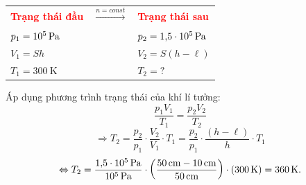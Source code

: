 \begin{vd}
{\begin{center}
		\begin{tabular}{C{4cm} C{1.5cm} C{5cm}}
			\colorbox{green!40!white}{\textcolor{red}{\textbf{Trạng thái đầu}}} & $\xrightarrow[]{ n=const}$ & \colorbox{green!40!white}{\textcolor{red}{\textbf{Trạng thái sau}}}\\
			$p_1=\SI{E5}{\pascal}$ & & $p_2=\SI{1.5E5}{\pascal}$\\
			$V_1=Sh$ & & $V_2=S\left(h-\ell\right)$\\
			$T_1=\SI{300}{\kelvin}$ & & $T_2=?$
		\end{tabular}
	\end{center}
	Áp dụng phương trình trạng thái của khí lí tưởng:
	$$\dfrac{p_1V_1}{T_1}=\dfrac{p_2V_2}{T_2}$$
	$$\Rightarrow T_2=\dfrac{p_2}{p_1}\cdot\dfrac{V_2}{V_1}\cdot T_1=\dfrac{p_2}{p_1}\cdot\dfrac{\left(h-\ell\right)}{h}\cdot T_1$$
	$$\Leftrightarrow T_2=\dfrac{\SI{1.5E5}{\pascal}}{\SI{E5}{\pascal}}\cdot\left(\dfrac{\SI{50}{\centi\meter}-\SI{10}{\centi\meter}}{\SI{50}{\centi\meter}}\right)\cdot\left(\SI{300}{\kelvin}\right)=\SI{360}{\kelvin}.$$
}
\end{vd}

